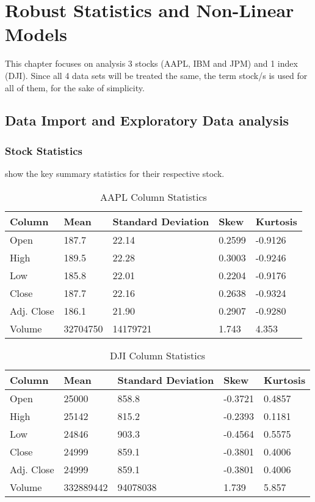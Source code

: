\chapter{Robust Statistics and Non-Linear Models}

This chapter focuses on analysis 3 stocks (AAPL, IBM and JPM) and 1 index (DJI). Since all 4 data sets will be treated the same, the term stock/s is used for all of them, for the sake of simplicity.

\section{Data Import and Exploratory Data analysis}
\subsection{Stock Statistics}

 show the key summary statistics for their respective stock.
\begin{table}[h]
    \centering
    \begin{tabular}{l|l|l|l|l}
    Column     & Mean     & Standard Deviation  & Skew    & Kurtosis  \\ \hline
    Open       & 187.7    & 22.14               & 0.2599  & -0.9126   \\ 
    High       & 189.5    & 22.28               & 0.3003  & -0.9246  \\ 
    Low        & 185.8    & 22.01               & 0.2204  & -0.9176  \\ 
    Close      & 187.7    & 22.16               & 0.2638  & -0.9324  \\ 
    Adj. Close & 186.1    & 21.90               & 0.2907  & -0.9280  \\
    Volume     & 32704750 & 14179721            & 1.743   & 4.353   
    \end{tabular}
    \caption{AAPL Column Statistics}
    \label{table:part_4:aapl_stats}
\end{table}

\begin{table}[h]
    \centering
    \begin{tabular}{l|l|l|l|l}
    Column     & Mean     & Standard Deviation  & Skew    & Kurtosis  \\ \hline
    Open       & 25000    & 858.8               & -0.3721 & 0.4857   \\ 
    High       & 25142    & 815.2               & -0.2393 & 0.1181  \\ 
    Low        & 24846    & 903.3               & -0.4564 & 0.5575  \\ 
    Close      & 24999    & 859.1               & -0.3801 & 0.4006  \\ 
    Adj. Close & 24999    & 859.1               & -0.3801 & 0.4006 \\
    Volume     & 332889442 & 94078038           & 1.739  & 5.857   
    \end{tabular}
    \caption{DJI Column Statistics}
    \label{table:part_4:dji_stats}
\end{table}

